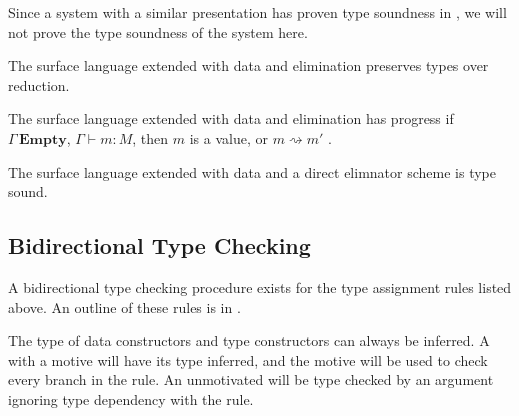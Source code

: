 Since a system with a similar presentation has proven type soundness in \cite{sjoberg2012irrelevance}, we will not prove the type soundness of the system here.

\begin{claim}
The surface language extended with data and elimination preserves types over reduction.
\end{claim}

\begin{claim}
The surface language extended with data and elimination has progress
if $\Gamma\,\mathbf{Empty}$, \textup{$\Gamma\vdash m:M$}, then $m$
is a value, or $m\rightsquigarrow m'$ .
\end{claim}

\begin{claim}
The surface language extended with data and a direct elimnator scheme is type sound.
\end{claim}

\subsection{Bidirectional Type Checking}

A bidirectional type checking procedure exists for the type assignment rules listed above.
An outline of these rules is in .

The type of data constructors and type constructors can always be inferred.
A \case{} with a motive will have its type inferred, and the motive will be used to check every branch in the  rule.
An unmotivated \case{} will be type checked by an argument ignoring type dependency with the  rule.

